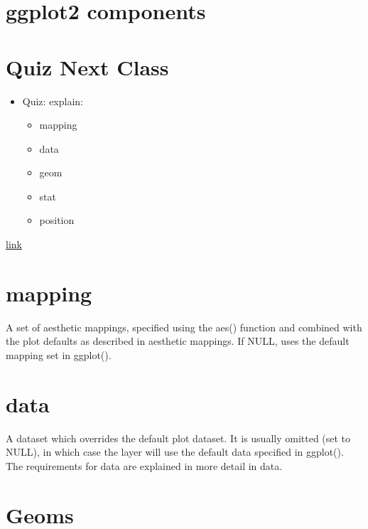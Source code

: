 \documentclass[
]{book}
\providecommand{\tightlist}{%
  \setlength{\itemsep}{0pt}\setlength{\parskip}{0pt}}
\theoremstyle{definition}
\theoremstyle{definition}
\theoremstyle{definition}
\theoremstyle{definition}
\theoremstyle{remark}
\begin{document}
\hypertarget{ggplot2-components}{%
\section{ggplot2 components}\label{ggplot2-components}}

\hypertarget{quiz-next-class}{%
\section{Quiz Next Class}\label{quiz-next-class}}

\begin{itemize}
\tightlist
\item
  Quiz: explain:

  \begin{itemize}
  \tightlist
  \item
    mapping
  \item
    data
  \item
    geom
  \item
    stat
  \item
    position
  \end{itemize}
\end{itemize}

\href{https://rpubs.com/hadley/ggplot2-layers}{link}

\hypertarget{mapping}{%
\section{mapping}\label{mapping}}

A set of aesthetic mappings, specified using the aes() function and combined with the plot defaults as described in aesthetic mappings. If NULL, uses the default mapping set in ggplot().

\hypertarget{data}{%
\section{data}\label{data}}

A dataset which overrides the default plot dataset. It is usually omitted (set to NULL), in which case the layer will use the default data specified in ggplot(). The requirements for data are explained in more detail in data.

\hypertarget{geoms}{%
\section{Geoms}\label{geoms}}
\end{document}

